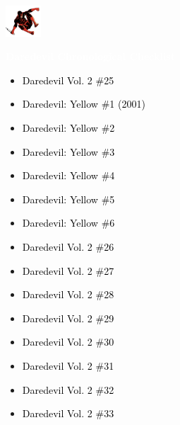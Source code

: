 \documentclass[12pt]{article}
\newcommand{\checkbox}{\raisebox{0.0ex}{\fbox{\rule{0ex}{1.5ex} \rule{1.5ex}{0ex}}}}
\begin{document}
\begin{center}
    \vspace*{2cm}
    \includegraphics[width=0.1\textwidth]{daredevil1.png}
    \vspace{0.3cm}

    {\Huge \textbf{\textcolor{white}{Daredevil Chronological Checklist}}}
\end{center}

\vspace{0.3cm}
\noindent
\begin{tcolorbox}[
  colback=white!95!gray,
  colframe=black,
  width=\textwidth,
  arc=4mm,
  auto outer arc,
  boxrule=0.8pt,
  left=8pt,right=8pt,top=8pt,bottom=8pt
]
\begin{itemize}[left=0pt,label={\checkbox}]
    \item \textcolor{black}{Daredevil Vol. 2 \#25}
    \item \textcolor{black}{Daredevil: Yellow \#1 (2001)}
    \item \textcolor{black}{Daredevil: Yellow \#2}
    \item \textcolor{black}{Daredevil: Yellow \#3}
    \item \textcolor{black}{Daredevil: Yellow \#4}
    \item \textcolor{black}{Daredevil: Yellow \#5}
    \item \textcolor{black}{Daredevil: Yellow \#6}
    \item \textcolor{black}{Daredevil Vol. 2 \#26}
    \item \textcolor{black}{Daredevil Vol. 2 \#27}
    \item \textcolor{black}{Daredevil Vol. 2 \#28}
    \item \textcolor{black}{Daredevil Vol. 2 \#29}
    \item \textcolor{black}{Daredevil Vol. 2 \#30}
    \item \textcolor{black}{Daredevil Vol. 2 \#31}
    \item \textcolor{black}{Daredevil Vol. 2 \#32}
    \item \textcolor{black}{Daredevil Vol. 2 \#33}
\end{itemize}
\end{tcolorbox}
\end{document}
